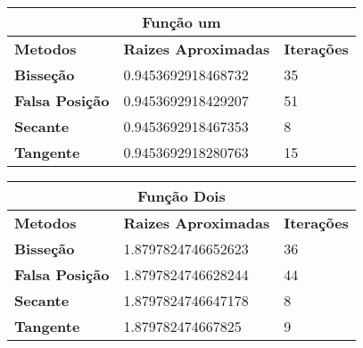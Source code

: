 \documentclass[12pt]{article}
\begin{document}
\begin{table}[]
\begin{tabular}{lll}
\multicolumn{3}{c}{\textbf{Função um}}                                                                              \\ \hline
\multicolumn{1}{l|}{\textbf{Metodos}}       & \multicolumn{1}{l|}{\textbf{Raizes Aproximadas}} & \textbf{Iterações} \\ \hline
\multicolumn{1}{l|}{\textbf{Bisseção}}      & \multicolumn{1}{l|}{0.9453692918468732}          & 35                 \\ \hline
\multicolumn{1}{l|}{\textbf{Falsa Posição}} & \multicolumn{1}{l|}{0.9453692918429207}          & 51                 \\ \hline
\multicolumn{1}{l|}{\textbf{Secante}}       & \multicolumn{1}{l|}{0.9453692918467353}          & 8                  \\ \hline
\multicolumn{1}{l|}{\textbf{Tangente}}      & \multicolumn{1}{l|}{0.9453692918280763}          & 15                
\end{tabular}
\end{table}

\begin{table}[]
\begin{tabular}{lll}
\multicolumn{3}{c}{\textbf{Função Dois}}                                                                            \\ \hline
\multicolumn{1}{l|}{\textbf{Metodos}}       & \multicolumn{1}{l|}{\textbf{Raizes Aproximadas}} & \textbf{Iterações} \\ \hline
\multicolumn{1}{l|}{\textbf{Bisseção}}      & \multicolumn{1}{l|}{1.8797824746652623}          & 36                 \\ \hline
\multicolumn{1}{l|}{\textbf{Falsa Posição}} & \multicolumn{1}{l|}{1.8797824746628244}          & 44                 \\ \hline
\multicolumn{1}{l|}{\textbf{Secante}}       & \multicolumn{1}{l|}{1.8797824746647178}          & 8                  \\ \hline
\multicolumn{1}{l|}{\textbf{Tangente}}      & \multicolumn{1}{l|}{1.879782474667825}           & 9
\end{tabular}
\end{table}
\end{document}
